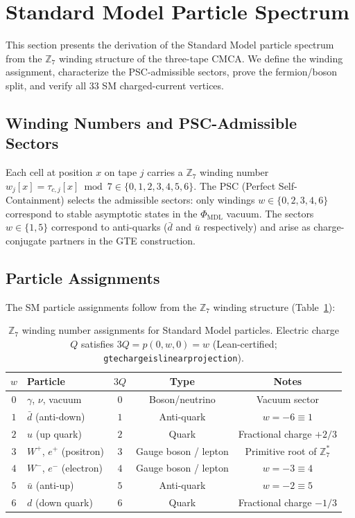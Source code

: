 \documentclass[11pt]{article}
\theoremstyle{remark}
\newcommand{\PHIMDL}{\Phi_{\mathrm{MDL}}}
\newcommand{\ZS}{\mathbb{Z}_7}
\newcommand{\lean}[1]{%
  \penalty-100
  \begingroup\def\_{\textunderscore\allowbreak}\texttt{#1}\endgroup}
\newcommand{\CMCA}{\text{CMCA}}
\begin{document}
\section{Standard Model Particle Spectrum}
\label{sec:sm}

This section presents the derivation of the Standard Model particle spectrum
from the $\ZS$ winding structure of the three-tape $\CMCA$. We define the
winding assignment, characterize the PSC-admissible sectors, prove the
fermion/boson split, and verify all 33 SM charged-current vertices.

\subsection{Winding Numbers and PSC-Admissible Sectors}

Each cell at position $x$ on tape $j$ carries a $\ZS$ winding number
$w_j[x] = \tau_{c,j}[x] \bmod 7 \in \{0,1,2,3,4,5,6\}$. The PSC (Perfect Self-Containment) selects the admissible sectors: only windings
$w \in \{0, 2, 3, 4, 6\}$ correspond to stable asymptotic states in the
$\PHIMDL$ vacuum. The sectors $w \in \{1, 5\}$ correspond to anti-quarks
($\bar{d}$ and $\bar{u}$ respectively) and arise as charge-conjugate
partners in the GTE construction.

\subsection{Particle Assignments}

The SM particle assignments follow from the $\ZS$ winding structure
(Table~\ref{tab:winding}):

\begin{table}[ht]
\centering
\caption{$\ZS$ winding number assignments for Standard Model particles.
  Electric charge $Q$ satisfies $3Q = p(0,w,0) = w$ (Lean-certified;
  \lean{gte\_charge\_is\_linear\_projection}).}
\label{tab:winding}
\begin{tabular}{clccc}
\toprule
$w$ & Particle & $3Q$ & Type & Notes \\
\midrule
$0$ & $\gamma$, $\nu$, vacuum & $0$ & Boson/neutrino & Vacuum sector \\
$1$ & $\bar{d}$ (anti-down) & $1$ & Anti-quark & $w = -6 \equiv 1$ \\
$2$ & $u$ (up quark) & $2$ & Quark & Fractional charge $+2/3$ \\
$3$ & $W^+$, $e^+$ (positron) & $3$ & Gauge boson / lepton & Primitive root of $\ZS^*$ \\
$4$ & $W^-$, $e^-$ (electron) & $4$ & Gauge boson / lepton & $w = -3 \equiv 4$ \\
$5$ & $\bar{u}$ (anti-up) & $5$ & Anti-quark & $w = -2 \equiv 5$ \\
$6$ & $d$ (down quark) & $6$ & Quark & Fractional charge $-1/3$ \\
\bottomrule
\end{tabular}
\end{table}
\end{document}
